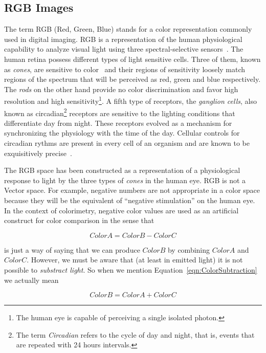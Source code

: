 \subsection{RGB Images}

The term RGB (Red, Green, Blue) stands for a color representation commonly used
in digital imaging. RGB is a representation of the human physiological
capability to analyze visual light using three spectral-selective
sensors~\cite{Malacara2002,Wyszecki2000}. The human retina possess different
types of light sensitive cells. Three of them, known as \emph{cones}, are
sensitive to color~\cite{Gray2003} and their regions of sensitivity loosely
match regions of the spectrum that will be perceived as red, green and blue
respectively. The \emph{rods} on the other hand provide no color discrimination
and favor high resolution and high sensitivity\footnote{The human eye is
capable of perceiving a single isolated photon.}. A fifth type of receptors,
the \emph{ganglion cells}, also known as circadian\footnote{The term
\emph{Circadian} refers to the cycle of day and night, that is, events that are
repeated with 24 hours intervals.} receptors are sensitive to the lighting
conditions that differentiate day from night. These receptors evolved as a
mechanism for synchronizing the physiology with the time of the day. Cellular
controls for circadian rythms are present in every cell of an organism and are
known to be exquisitively precise~\cite{Lodish2000}.

The RGB space has been constructed as a representation of a physiological
response to light by the three types of \emph{cones} in the human eye. RGB is
not a Vector space. For example, negative numbers are not appropriate in a
color space because they will be the equivalent of ``negative stimulation'' on
the human eye. In the context of colorimetry, negative color values are used
as an artificial construct for color comparison in the sense that

\begin{equation}
\label{eqn:ColorSubtraction}
         ColorA = ColorB - ColorC
\end{equation}

is just a way of saying that we can produce $ColorB$ by combining $ColorA$ and
$ColorC$. However, we must be aware that (at least in emitted light) it is not
possible to \emph{substract light}. So when we mention
Equation~\ref{eqn:ColorSubtraction} we actually mean

\begin{equation}
\label{eqn:ColorAddition}
         ColorB = ColorA + ColorC
\end{equation}

